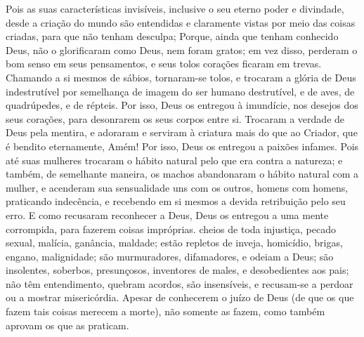 {Pois as suas características invisíveis, inclusive o seu eterno poder e divindade, desde a criação do mundo são entendidas e claramente vistas por meio das coisas criadas, para que não tenham desculpa;
Porque, ainda que tenham conhecido Deus, não o glorificaram como Deus, nem foram gratos; em vez disso, perderam o bom senso em seus pensamentos,
 e seus tolos corações ficaram em trevas.
Chamando a si mesmos de sábios, tornaram-se tolos,
e trocaram a glória de Deus indestrutível por semelhança de imagem do ser humano destrutível, e de aves, de quadrúpedes, e de répteis.
Por isso, Deus os entregou à imundície, nos desejos dos seus corações, para desonrarem os seus corpos entre si.
Trocaram a verdade de Deus pela mentira, e adoraram e serviram à criatura mais do que ao Criador, que é bendito eternamente, Amém!
Por isso, Deus os entregou a paixões infames. Pois até suas mulheres trocaram o hábito
{} natural pelo que era contra a natureza;
e também, de semelhante maneira, os machos abandonaram o hábito
{} natural com a mulher, e acenderam sua sensualidade uns com os outros, homens com homens, praticando indecência, e recebendo em si mesmos a devida retribuição pelo seu erro.
E como recusaram reconhecer a Deus,
{} Deus os entregou a uma mente corrompida, para fazerem coisas impróprias.
 cheios de toda injustiça, pecado sexual, malícia, ganância, maldade; estão repletos de inveja, homicídio, brigas, engano, malignidade;
são murmuradores, difamadores, e odeiam a Deus; são insolentes, soberbos, presunçosos, inventores de males, e desobedientes aos pais;
não têm entendimento, quebram acordos, são insensíveis, e recusam-se a perdoar ou a mostrar misericórdia.
Apesar de conhecerem o juízo de Deus (de que os que fazem tais coisas merecem a morte), não somente as fazem, como também aprovam os que as praticam.

}
